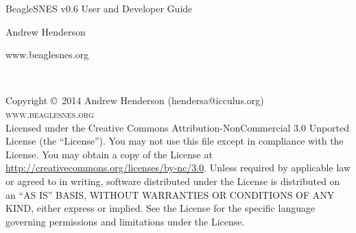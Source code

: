 \documentclass[11pt,fleqn]{book} %
\begin{document}

\begingroup
\thispagestyle{empty}
\centering
\vspace*{9cm}
\par\normalfont\fontsize{35}{35}\sffamily\selectfont
BeagleSNES v0.6 User and Developer Guide\par %
\vspace*{1cm}
{\Huge Andrew Henderson}\par %
{\Huge www.beaglesnes.org}\par %
\endgroup


\newpage
~\vfill
\thispagestyle{empty}

\noindent Copyright \copyright\ 2014 Andrew Henderson (hendersa@icculus.org)\\ %


\noindent \textsc{www.beaglesnes.org}\\ %

\noindent Licensed under the Creative Commons Attribution-NonCommercial 3.0 Unported License (the ``License''). You may not use this file except in compliance with the License. You may obtain a copy of the License at \url{http://creativecommons.org/licenses/by-nc/3.0}. Unless required by applicable law or agreed to in writing, software distributed under the License is distributed on an \textsc{``AS IS'' BASIS, WITHOUT WARRANTIES OR CONDITIONS OF ANY KIND}, either express or implied. See the License for the specific language governing permissions and limitations under the License.\\ %
\end{document}
